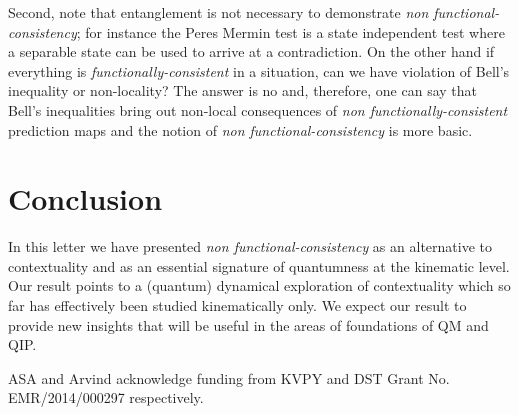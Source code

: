 \documentclass[doublecol,british]{epl2}
\theoremstyle{plain}
\theoremstyle{plain}
\theoremstyle{definition}
\theoremstyle{remark}
\theoremstyle{remark}
\theoremstyle{remark}
\theoremstyle{plain}
\theoremstyle{plain}
\theoremstyle{plain}
\theoremstyle{definition}
\theoremstyle{definition}
\begin{document}
{ Second, note that} entanglement is not necessary to demonstrate
\emph{non functional-consistency}; for instance the
Peres Mermin test is a state independent test
where a separable state can be used to arrive at a
contradiction. On the other hand if everything is
\emph{functionally-consistent} in a situation, can we have
violation of Bell's inequality or non-locality?
The answer is no and, therefore, one can say that
Bell's inequalities bring out  non-local
consequences of \emph{non functionally-consistent} prediction
maps and the notion of \emph{non functional-consistency} is
more basic.

\section{Conclusion}
In this letter we have presented
\emph{non functional-consistency} as an alternative to
contextuality and as an essential signature of
quantumness at the kinematic level. Our result
points to a (quantum) dynamical exploration of contextuality which 
so far has effectively been studied kinematically only.
We expect our result to provide new insights that will be useful
in the areas of foundations of QM and QIP.



\acknowledgments
ASA and Arvind acknowledge
funding from KVPY and DST Grant No.
EMR/2014/000297 respectively.






\end{document}
